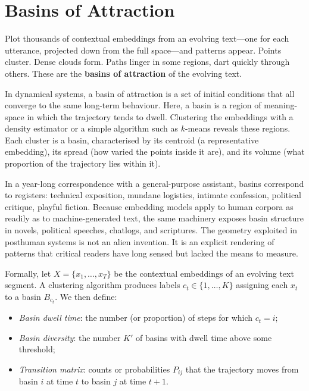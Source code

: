 \documentclass[12pt,a4paper]{article}
\begin{document}
\section{Basins of Attraction}

Plot thousands of contextual embeddings from an evolving text---one for each utterance, projected down from the full space---and patterns appear. Points cluster. Dense clouds form. Paths linger in some regions, dart quickly through others. These are the \textbf{basins of attraction} of the evolving text.

In dynamical systems, a basin of attraction is a set of initial conditions that all converge to the same long-term behaviour. Here, a basin is a region of meaning-space in which the trajectory tends to dwell. Clustering the embeddings with a density estimator or a simple algorithm such as $k$-means reveals these regions. Each cluster is a basin, characterised by its centroid (a representative embedding), its spread (how varied the points inside it are), and its volume (what proportion of the trajectory lies within it).

In a year-long correspondence with a general-purpose assistant, basins correspond to registers: technical exposition, mundane logistics, intimate confession, political critique, playful fiction. Because embedding models apply to human corpora as readily as to machine-generated text, the same machinery exposes basin structure in novels, political speeches, chatlogs, and scriptures. The geometry exploited in posthuman systems is not an alien invention. It is an explicit rendering of patterns that critical readers have long sensed but lacked the means to measure.

Formally, let $X = \{x_1, \ldots, x_T\}$ be the contextual embeddings of an evolving text segment. A clustering algorithm produces labels $c_t \in \{1, \ldots, K\}$ assigning each $x_t$ to a basin $B_{c_t}$. We then define:

\begin{itemize}
  \item \emph{Basin dwell time}: the number (or proportion) of steps for which $c_t = i$;
  \item \emph{Basin diversity}: the number $K'$ of basins with dwell time above some threshold;
  \item \emph{Transition matrix}: counts or probabilities $P_{ij}$ that the trajectory moves from basin $i$ at time $t$ to basin $j$ at time $t+1$.
\end{itemize}
\end{document}
